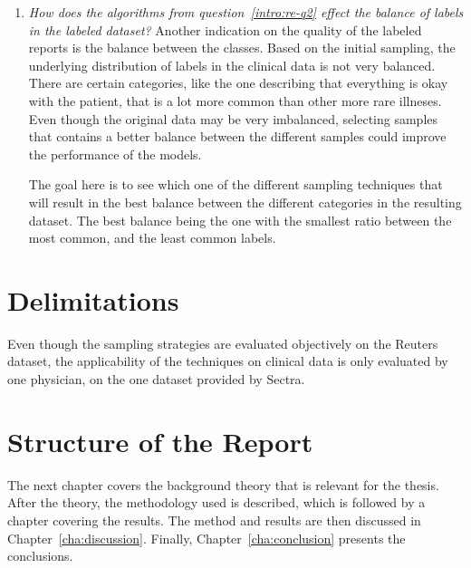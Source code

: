 \begin{enumerate}
  \item \label{intro:re-q3}
      \textit{How does the algorithms from question~\ref{intro:re-q2} effect the balance of labels in the labeled dataset?}
      Another indication on the quality of the labeled reports is the balance between the classes.
      Based on the initial sampling, the underlying distribution of labels in the clinical data is not very balanced.
      There are certain categories, like the one describing that everything is okay with the patient, that is a lot more common than other more rare illneses.
      Even though the original data may be very imbalanced, selecting samples that contains a better balance between the different samples could improve the performance of the models.

      The goal here is to see which one of the different sampling techniques that will result in the best balance between the different categories in the resulting dataset.
      The best balance being the one with the smallest ratio between the most common, and the least common labels.
\end{enumerate}

\section{Delimitations}
\label{sec:delimitations}

Even though the sampling strategies are evaluated objectively on the Reuters dataset, the applicability of the techniques on clinical data is only evaluated by one physician, on the one dataset provided by Sectra.

\section{Structure of the Report}
\label{sec:structure}

The next chapter covers the background theory that is relevant for the thesis.
After the theory, the methodology used is described, which is followed by a chapter covering the results.
The method and results are then discussed in Chapter~\ref{cha:discussion}.
Finally, Chapter~\ref{cha:conclusion} presents the conclusions.
